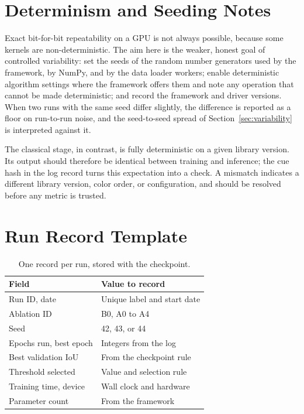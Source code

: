 \documentclass[10pt,a4paper,twocolumn]{article}
\begin{document}
\section{Determinism and Seeding Notes}
Exact bit-for-bit repeatability on a GPU is not always possible, because some kernels are non-deterministic. The aim here is the weaker, honest goal of controlled variability: set the seeds of the random number generators used by the framework, by NumPy, and by the data loader workers; enable deterministic algorithm settings where the framework offers them and note any operation that cannot be made deterministic; and record the framework and driver versions. When two runs with the same seed differ slightly, the difference is reported as a floor on run-to-run noise, and the seed-to-seed spread of Section~\ref{sec:variability} is interpreted against it.

The classical stage, in contrast, is fully deterministic on a given library version. Its output should therefore be identical between training and inference; the cue hash in the log record turns this expectation into a check. A mismatch indicates a different library version, color order, or configuration, and should be resolved before any metric is trusted.

\section{Run Record Template}
\begin{table}[H]
\centering
\caption{One record per run, stored with the checkpoint.}
\footnotesize
\begin{tabularx}{\columnwidth}{|l|X|}
\hline
\rowcolor{gray!18}\textbf{Field}&\textbf{Value to record}\\ \hline
Run ID, date & Unique label and start date\\ \hline
Ablation ID & B0, A0 to A4\\ \hline
Seed & 42, 43, or 44\\ \hline
Epochs run, best epoch & Integers from the log\\ \hline
Best validation IoU & From the checkpoint rule\\ \hline
Threshold selected & Value and selection rule\\ \hline
Training time, device & Wall clock and hardware\\ \hline
Parameter count & From the framework\\ \hline
\end{tabularx}
\end{table}
\end{document}
